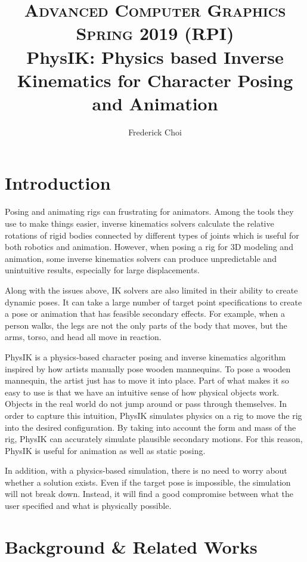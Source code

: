 \documentclass[10pt,twocolumn,letterpaper]{article}
\title{
        \usefont{OT1}{bch}{b}{n}
        \normalfont \normalsize \textsc{Advanced Computer Graphics Spring 2019 (RPI)} \\ [10pt]
        \huge PhysIK: Physics based Inverse Kinematics for Character Posing and Animation \\
}
\author[0]{Frederick Choi}
\begin{document}
\maketitle


\section{Introduction}
Posing and animating rigs can frustrating for animators. Among the tools they use to make things easier, inverse kinematics solvers calculate the relative rotations of rigid bodies connected by different types of joints which is useful for both robotics and animation. However, when posing a rig for 3D modeling and animation, some inverse kinematics solvers can produce unpredictable and unintuitive results, especially for large displacements.

Along with the issues above, IK solvers are also limited in their ability to create dynamic poses. It can take a large number of target point specifications to create a pose or animation that has feasible secondary effects. For example, when a person walks, the legs are not the only parts of the body that moves, but the arms, torso, and head all move in reaction.

PhysIK is a physics-based character posing and inverse kinematics algorithm inspired by how artists manually pose wooden mannequins. To pose a wooden mannequin, the artist just has to move it into place. Part of what makes it so easy to use is that we have an intuitive sense of how physical objects work. Objects in the real world do not jump around or pass through themselves. In order to capture this intuition, PhysIK simulates physics on a rig to move the rig into the desired configuration. By taking into account the form and mass of the rig, PhysIK can accurately simulate plausible secondary motions. For this reason, PhysIK is useful for animation as well as static posing.

In addition, with a physics-based simulation, there is no need to worry about whether a solution exists. Even if the target pose is impossible, the simulation will not break down. Instead, it will find a good compromise between what the user specified and what is physically possible.

\section{Background \& Related Works}
\end{document}
